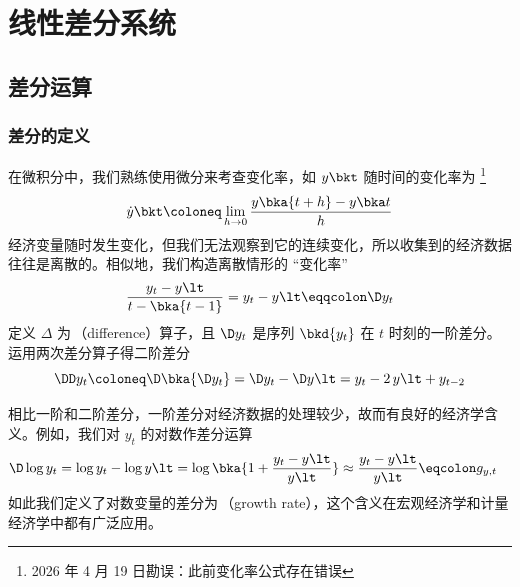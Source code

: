 

\ChapterGeometry

\chapter{线性差分系统}\label{ch:01}

\section{差分运算}\label{sec:Diff}

\subsection{差分的定义}\label{subsec:DiffDef}

在微积分中，我们熟练使用微分来考查变化率，如 \(y\bkt\) 随时间的变化率为 \footnote{2026 年 4 月 19 日勘误：此前变化率公式存在错误}
\begin{equation}
    \dot y\bkt\coloneq \lim_{h\to 0}\frac{y\bka{t+h} - y\bka t}{h}
\end{equation}
经济变量随时发生变化，但我们无法观察到它的连续变化，所以收集到的经济数据往往是离散的。相似地，我们构造离散情形的 “变化率”
\begin{equation}
    \dfrac{y_t - y\lt}{t-\bka{t-1}}=y_t - y\lt \eqqcolon \D  y_t
\end{equation}
定义 \(\Delta\) 为\,（difference）算子，且 \(\D  y_t\) 是序列 \(\bkd{y_t}\) 在 \(t\) 时刻的一阶差分。运用两次差分算子得二阶差分
\begin{equation*}
    \DD y_t \coloneq \D \bka{\D  y_t}= \D  y_t - \D  y\lt = y_t - 2\,y\lt + y_{t-2}
\end{equation*}

相比一阶和二阶差分，一阶差分对经济数据的处理较少，故而有良好的经济学含义。例如，我们对 \(y_t\) 的对数作差分运算
\begin{align}
    \D \log y_t &= \log y_t - \log y\lt = \log\bka{1+\dfrac{y_t-y\lt}{y\lt}} \approx \frac{y_t - y\lt}{y\lt} \eqcolon g_{y,t}
\end{align}
如此我们定义了对数变量的差分为\,（growth rate），这个含义在宏观经济学和计量经济学中都有广泛应用。

